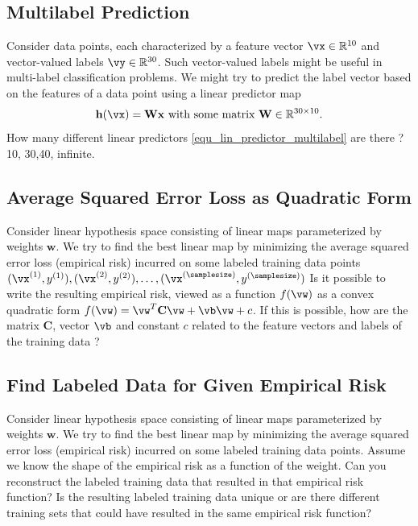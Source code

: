 \documentclass[12pt]{report}
\newcommand{\vh}{\mathbf{h}}
\begin{document}
\subsection{Multilabel Prediction} 
\label{ex_ch2_multilabel}
Consider data points, each characterized by a feature vector $\vx \in \mathbb{R}^{10}$ and 
vector-valued labels $\vy \in \mathbb{R}^{30}$. Such vector-valued labels might be useful 
in multi-label classification problems. We might try to predict the label vector based on the 
features of a data point using a linear predictor map 
\begin{equation}
\label{equ_lin_predictor_multilabel}
\vh(\vx) = \mathbf{W} \mathbf{x} \mbox{ with some matrix } \mathbf{W} \in \mathbb{R}^{30 \times 10}. 
\end{equation} 
How many different linear predictors \eqref{equ_lin_predictor_multilabel} are there ? 
10, 30,40, infinite. 




\subsection{Average Squared Error Loss as Quadratic Form} 
\label{ex_2_0}
Consider linear hypothesis space consisting of linear maps parameterized by 
weights $\mathbf{w}$. We try to find the best linear map by minimizing the average 
squared error loss (empirical risk) incurred on some labeled training data points 
$(\vx^{(1)},y^{(1)}),(\vx^{(2)},y^{(2)}),\ldots,(\vx^{(\samplesize)},y^{(\samplesize)})$ 
Is it possible to write the resulting empirical risk, viewed as a function $f(\vw)$ as 
a convex quadratic form $f(\vw) = \vw^{T} \mathbf{C} \vw + \vb \vw + c$. If this 
is possible, how are the matrix $\mathbf{C}$, vector $\vb$ and constant $c$ related 
to the feature vectors and labels of the training data ? 


\subsection{Find Labeled Data for Given Empirical Risk} 
\label{ex_2_1}
Consider linear hypothesis space consisting of linear maps parameterized by 
weights $\mathbf{w}$. We try to find the best linear map by minimizing the average 
squared error loss (empirical risk) incurred on some labeled training data points. 
Assume we know the shape of the empirical risk as a function of the weight. 
Can you reconstruct the labeled training data that resulted in that empirical risk 
function? Is the resulting labeled training data unique or are there different training sets 
that could have resulted in the same empirical risk function? 
\end{document}
